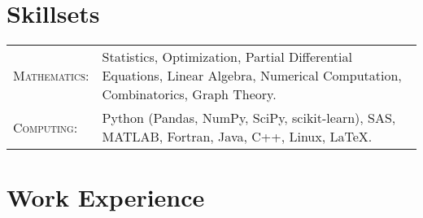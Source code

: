 \documentclass[letterpaper,10pt]{article} %
\begin{document}

\section{Skillsets}

\begin{center}
\begin{tabular}{R{4.25cm}L{11.25cm}}

\textsc{Mathematics:} & Statistics, Optimization, Partial Differential Equations, Linear Algebra, Numerical Computation, Combinatorics, Graph Theory.\\
\textsc{Computing:} & Python (Pandas, NumPy, SciPy, scikit-learn), SAS, MATLAB, Fortran, Java, C++, Linux, \LaTeX.

\end{tabular}
\end{center}


\section{Work Experience}
\end{document}
